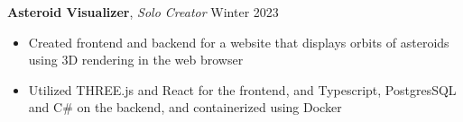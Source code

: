 \documentclass[11pt]{article}
\newcommand{\project}[3]{
    \topitemspacing
    \normalsize
    \noindent\textbf{#1}, \textit{#2}
    \hfill
    \noindent#3
    \toplistspacing
}
\newcommand{\sectionendspace}{
    \vspace{0.1in}
}
\newcommand{\toplistspacing}{
    \vspace{0.04in}
}
\newcommand{\topitemspacing}{
    \vspace{0.1in}
}
\begin{document}
    \project{Asteroid Visualizer}{Solo Creator}{Winter 2023}
    \begin{itemize}[noitemsep,nolistsep]
        \item Created frontend and backend for a website that displays orbits of asteroids using 3D rendering in the web browser
        \item Utilized THREE.js and React for the frontend, and Typescript, PostgresSQL and C\# on the backend, and containerized using Docker
    \end{itemize}
    \sectionendspace
\end{document}
